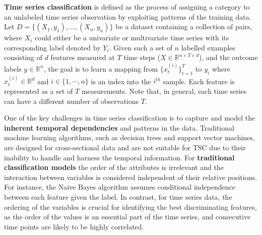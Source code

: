 \textbf{Time series classification} is defined as the process of assigning a category to an unlabeled time series observation by exploiting patterns of the training data.
Let 
$D=\{(X_{1}, y_{1}), \ldots, (X_{n}, y_{n})\}$ 
be a dataset containing a collection of pairs, where $X_{i}$ could either be a univariate or multivariate time series with its corresponding label denoted by $Y_{i}$.
Given such a set of $n$ labelled examples consisting of $d$ features measured at $T$ time steps ($X \in \mathbb{R}^{n \times T \times d}$), and the outcome labels $y \in \mathbb{R}^{n}$, the goal is to learn a mapping from $\{x_{t}^{(i)}\}_{t=1}^{T}$ to $y_{i}$ where $x_{t}^{(i)} \in \mathbb{R}^{d}$ and $i \in \{1,\cdots,n\}$ is an index into the $i^{th}$ sample. Each feature is represented as a set of $T$ measurements. 
Note that, in general, each time series can have a different number of observations $T$.


One of the key challenges in time series classification is to capture and model the \textbf{inherent temporal dependencies} and patterns in the data. Traditional machine learning algorithms, such as decision trees and support vector machines, are designed for cross-sectional data and are not suitable for TSC due to their inability to handle and harness the temporal information. 
For \textbf{traditional classification models} the order of the attributes is irrelevant and the interaction between variables is considered independent of their relative positions. For instance, the Naive Bayes algorithm assumes conditional independence between each feature given the label.
In contrast, for time series data, the ordering of the variables is crucial for identifying the best discriminating features, as the order of the values is an essential part of the time series, and consecutive time points are likely to be highly correlated. 

